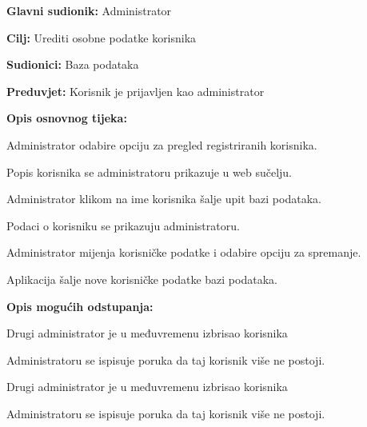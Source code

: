 				\noindent {}
				\begin{packed_item}
					
					\item \textbf{Glavni sudionik: }Administrator
					\item  \textbf{Cilj:} Urediti osobne podatke korisnika
					\item  \textbf{Sudionici:} Baza podataka
					\item  \textbf{Preduvjet:} Korisnik je prijavljen kao administrator
					\item  \textbf{Opis osnovnog tijeka:}
					
					\item[] \begin{packed_enum}
						
						\item Administrator odabire opciju za pregled registriranih korisnika.
						\item Popis korisnika se administratoru prikazuje u web sučelju.
						\item Administrator klikom na ime korisnika šalje upit bazi podataka.
						\item Podaci o korisniku se prikazuju administratoru.
						\item Administrator mijenja korisničke podatke i odabire opciju za spremanje.
						\item Aplikacija šalje nove korisničke podatke bazi podataka.
					\end{packed_enum}
					
					\item  \textbf{Opis mogućih odstupanja:}
					
					\item[] \begin{packed_item}
						
						\item[3.a] Drugi administrator je u međuvremenu izbrisao korisnika
						\item[] \begin{packed_enum}
							
							\item Administratoru se ispisuje poruka da taj korisnik više ne postoji.
							
						\end{packed_enum}
						\item[6.a] Drugi administrator je u međuvremenu izbrisao korisnika
						\item[] \begin{packed_enum}
							
							\item Administratoru se ispisuje poruka da taj korisnik više ne postoji.
							
						\end{packed_enum}
						
					\end{packed_item}
				\end{packed_item}
				
